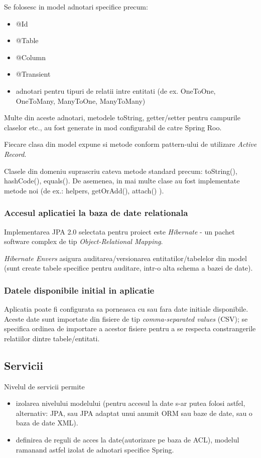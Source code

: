 Se folosesc in model adnotari specifice precum:
\begin{itemize}
  \item @Id
  \item @Table
  \item @Column
  \item @Transient
  \item adnotari pentru tipuri de relatii intre entitati (de ex. OneToOne, OneToMany, ManyToOne, ManyToMany) %
\end{itemize}

Multe din aceste adnotari, metodele toString, 
getter/setter pentru campurile claselor etc., 
au fost generate in mod configurabil de catre Spring Roo.

Fiecare clasa din model expune si metode conform pattern-ului de utilizare \emph{Active Record}.
 
Clasele din domeniu suprascriu cateva metode standard precum: toString(), hashCode(), equals().
De asemenea, in mai multe clase au fost implementate metode noi (de ex.: helpers, getOrAdd(), attach() ).

\subsubsection{Accesul aplicatiei la baza de date relationala}
Implementarea JPA 2.0 selectata pentru proiect este \emph{Hibernate} - 
un pachet software complex de tip \emph{Object-Relational Mapping}.

\emph{Hibernate Envers} asigura auditarea/versionarea entitatilor/tabelelor din
model (sunt create tabele specifice pentru auditare, intr-o alta schema a bazei
de date).

\subsubsection{Datele disponibile initial in aplicatie}
Aplicatia poate fi configurata sa porneasca cu sau fara date initiale
disponibile.
Aceste date sunt importate din fisiere de tip \emph{comma-separated values} (CSV); 
se specifica ordinea de importare a acestor fisiere pentru a se respecta constrangerile relatiilor
dintre tabele/entitati.

\subsection{Servicii}
Nivelul de servicii permite 
\begin{itemize}
\item 
izolarea nivelului modelului (pentru accesul la
date s-ar putea folosi astfel, alternativ: JPA, sau JPA adaptat unui anumit ORM sau
baze de date, sau o baza de date XML).
\item
definirea de reguli de acces la date(autorizare pe baza de ACL), modelul
ramanand astfel izolat de adnotari specifice Spring.
\end{itemize} 

